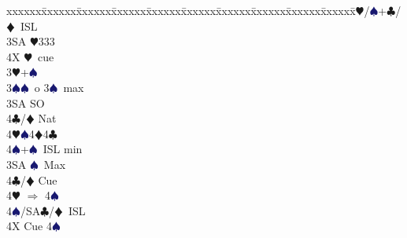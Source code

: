 \documentclass[a4paper,italian]{article}
\newcommand{\BC}{\textcolor{OliveGreen}{$\clubsuit$}}
\newcommand{\BD}{\textcolor{RedOrange}{$\vardiamondsuit$}}
\newcommand{\BH}{\textcolor{Red2}{$\varheartsuit${}}}
\newcommand{\BS}{\textcolor{MidnightBlue}{$\spadesuit${}}}
\newenvironment{bidtable}
{\begin{tabbing}

    xxxxxx\=xxxxxx\=xxxxxx\=xxxxxx\=xxxxxx\=xxxxxx\=xxxxxx\=xxxxxx\=xxxxxx\=xxxxxx\=\kill}
{\end{tabbing} }%
\begin{document}
\begin{multicols}{2}
\begin{bidtable}
                                            4\BH/\BS{}+\BC/\BD\ ISL\-\\
                                            3SA \BH 333\\
                                            4X \BH\ cue\-\\
                                            3\BH {}+\BS \+\\
                                            3\BS {}\BS\ o 3\BS\ max\+\\
                                            3SA \> SO\\
                                            4\BC/\BD \> Nat\\
                                            4\BH {}\BS 4\BD 4\BC \\
                                            4\BS {}+\BS\ ISL min\-\\
                                            3SA \BS\ Max\+\\
                                            4\BC/\BD\> Cue\\
                                            4\BH\> $\Rightarrow$ 4\BS\\
                                            4\BS/SA\BC/\BD\ ISL\-\\
                                            4X \> Cue 4\BS\\
                                        \end{bidtable}
                                    \end{multicols}
\end{document}
